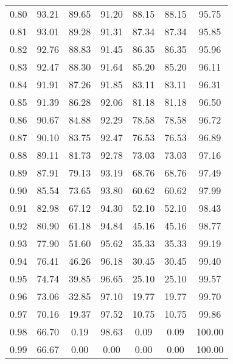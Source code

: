 \begin{tabular}{|c|c|c|c|c|c|c|}
      0.80 &     93.21 &     89.65 &      91.20 &   88.15 &      88.15 &         95.75 \\
      0.81 &     93.01 &     89.28 &      91.31 &   87.34 &      87.34 &         95.85 \\
      0.82 &     92.76 &     88.83 &      91.45 &   86.35 &      86.35 &         95.96 \\
      0.83 &     92.47 &     88.30 &      91.64 &   85.20 &      85.20 &         96.11 \\
      0.84 &     91.91 &     87.26 &      91.85 &   83.11 &      83.11 &         96.31 \\
      0.85 &     91.39 &     86.28 &      92.06 &   81.18 &      81.18 &         96.50 \\
      0.86 &     90.67 &     84.88 &      92.29 &   78.58 &      78.58 &         96.72 \\
      0.87 &     90.10 &     83.75 &      92.47 &   76.53 &      76.53 &         96.89 \\
      0.88 &     89.11 &     81.73 &      92.78 &   73.03 &      73.03 &         97.16 \\
      0.89 &     87.91 &     79.13 &      93.19 &   68.76 &      68.76 &         97.49 \\
      0.90 &     85.54 &     73.65 &      93.80 &   60.62 &      60.62 &         97.99 \\
      0.91 &     82.98 &     67.12 &      94.30 &   52.10 &      52.10 &         98.43 \\
      0.92 &     80.90 &     61.18 &      94.84 &   45.16 &      45.16 &         98.77 \\
      0.93 &     77.90 &     51.60 &      95.62 &   35.33 &      35.33 &         99.19 \\
      0.94 &     76.41 &     46.26 &      96.18 &   30.45 &      30.45 &         99.40 \\
      0.95 &     74.74 &     39.85 &      96.65 &   25.10 &      25.10 &         99.57 \\
      0.96 &     73.06 &     32.85 &      97.10 &   19.77 &      19.77 &         99.70 \\
      0.97 &     70.16 &     19.37 &      97.52 &   10.75 &      10.75 &         99.86 \\
      0.98 &     66.70 &      0.19 &      98.63 &    0.09 &       0.09 &        100.00 \\
      0.99 &     66.67 &      0.00 &       0.00 &    0.00 &       0.00 &        100.00 \\
\bottomrule
\end{tabular}
